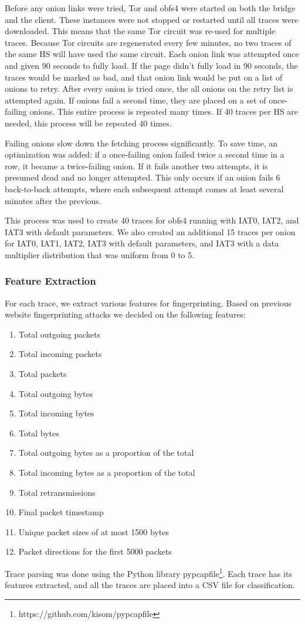 \documentclass[11pt]{article}
\begin{document}
Before any onion links were tried, Tor and obfs4 were started on both the bridge and the client. These instances were not stopped or restarted until all traces were downloaded. This means that the same Tor circuit was re-used for multiple traces. Because Tor circuits are regenerated every few minutes, no two traces of the same HS will have used the same circuit. Each onion link was attempted once and given 90 seconds to fully load. If the page didn't fully load in 90 seconds, the traces would be marked as bad, and that onion link would be put on a list of onions to retry. After every onion is tried once, the all onions on the retry list is attempted again. If onions fail a second time, they are placed on a set of once-failing onions. This entire process is repeated many times. If 40 traces per HS are needed, this process will be repeated 40 times.

Failing onions slow down the fetching process significantly. To save time, an optimization was added: if a once-failing onion failed twice a second time in a row, it became a twice-failing onion. If it fails another two attempts, it is presumed dead and no longer attempted. This only occurs if an onion fails 6 back-to-back attempts, where each subsequent attempt comes at least several minutes after the previous.

This process was used to create 40 traces for obfs4 running with IAT0, IAT2, and IAT3 with default parameters. We also created an additional 15 traces per onion for IAT0, IAT1, IAT2, IAT3 with default parameters, and IAT3 with a data multiplier distribution that was uniform from 0 to 5.

\subsubsection{Feature Extraction}
For each trace, we extract various features for fingerprinting.
Based on previous website fingerprinting attacks we decided on the following features:
\begin{enumerate}
    \item Total outgoing packets
    \item Total incoming packets
    \item Total packets
    \item Total outgoing bytes
    \item Total incoming bytes
    \item Total bytes
    \item Total outgoing bytes as a proportion of the total
    \item Total incoming bytes as a proportion of the total
    \item Total retransmissions
    \item Final packet timestamp
    \item Unique packet sizes of at most 1500 bytes
    \item Packet directions for the first 5000 packets
\end{enumerate}
Trace parsing was done using the Python library pypcapfile\footnote{https://github.com/kisom/pypcapfile}. Each trace has its features extracted, and all the traces are placed into a CSV file for classification.
\end{document}
